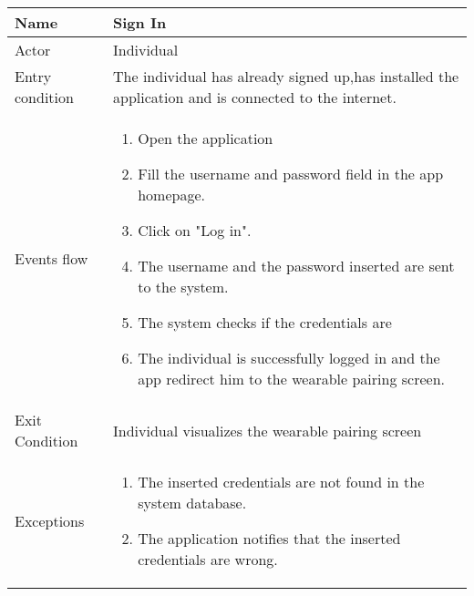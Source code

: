 \begin{tabular}{|l|p{13cm}|}
    \hline
    Name & Sign In
    \\ \hline
    Actor & Individual
    \\ \hline 
    Entry condition & The individual has already signed up,has installed the application and is connected to the internet.
    \\ \hline
    Events flow &
    \begin{enumerate}
    \item Open the application
    \item Fill the username and password field in the app homepage.
    \item Click on "Log in".
    \item The username and the password inserted are sent to the system.
    \item The system checks if the credentials are 
    \item The individual is successfully logged in and the app redirect him to the wearable pairing screen.
    \end{enumerate}
     \\ \hline
     Exit Condition & Individual visualizes the wearable pairing screen
     \\
    \hline
    Exceptions &
        \begin{enumerate}
    \item The inserted credentials are not found in the system database. 
    \item The application notifies that the inserted credentials are wrong.
    \end{enumerate}
      \\
    \hline
\end{tabular}



